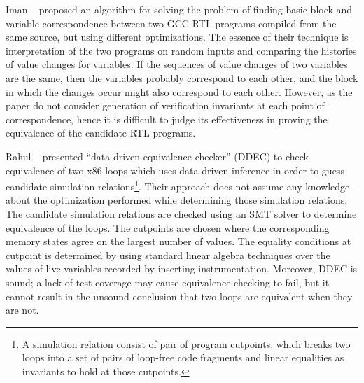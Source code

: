 Iman \etal~\cite{Iman2005} proposed an algorithm for solving the problem of
finding basic block and variable correspondence between two GCC RTL programs
compiled from the same source, but using different optimizations.  The essence
of their technique is interpretation of the two programs on random inputs and
comparing the histories of value changes for variables.  If the sequences of
value changes of two variables are the same, then the variables probably
correspond to each other, and the block in which the changes occur might also
correspond to each other. However, as the paper do not consider  generation of verification invariants  at each point of correspondence, hence it is difficult to judge  its effectiveness in proving the equivalence of the candidate 
RTL programs.




Rahul \etal~\cite{DDEC:OOPSLA:2013} presented ``data-driven equivalence checker'' (DDEC) to check equivalence of two x86 loops which uses data-driven inference in order to guess candidate simulation relations\footnote{A simulation relation consist of pair of program cutpoints, which breaks two loops into a set of pairs of loop-free code fragments and  linear equalities as invariants to hold at those cutpoints.}. Their approach does not assume any knowledge about the optimization performed while determining those simulation relations. The candidate simulation relations are checked using an SMT solver to determine equivalence of the loops. The cutpoints are chosen where the corresponding memory states agree on the largest number of values. The equality conditions   at cutpoint is determined by using standard linear algebra techniques over the values of live variables recorded by inserting instrumentation. Moreover, DDEC is sound; a lack of test coverage may cause equivalence checking to fail, but it cannot result in the unsound conclusion that two loops are equivalent when they are not.    



